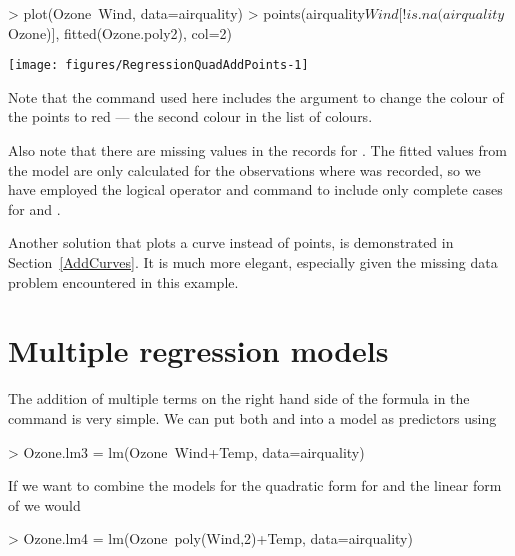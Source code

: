 \begin{Schunk}
\begin{Sinput}
> plot(Ozone~Wind, data=airquality) 
> points(airquality$Wind[!is.na(airquality$Ozone)], fitted(Ozone.poly2), col=2) 
\end{Sinput}

\texttt{[image: figures/RegressionQuadAddPoints-1]} \end{Schunk}

 
Note that the  command used here includes the  argument to change the colour of the points to red --- the second colour in the list of colours.  
 
Also note that there are missing values in the records for . The fitted values from the model are only calculated for the observations where  was recorded, so we have employed the \Rcmd{!} logical operator and  command to include only complete cases for  and . 
 
Another solution that plots a curve instead of points, is demonstrated in Section~\ref{AddCurves}. It is much more elegant, especially given the missing data problem encountered in this example. 
 
 
 
\section{Multiple regression models} 
 
The addition of multiple terms on the right hand side of the formula in the  command is very simple. We can put both  and  into a model as predictors using 

\begin{Schunk}
\begin{Sinput}
> Ozone.lm3 = lm(Ozone~Wind+Temp, data=airquality) 
\end{Sinput}
\end{Schunk}

If we want to combine the models for the quadratic form for  and the linear form of  we would 

\begin{Schunk}
\begin{Sinput}
> Ozone.lm4 = lm(Ozone~poly(Wind,2)+Temp, data=airquality) 
\end{Sinput}
\end{Schunk}

